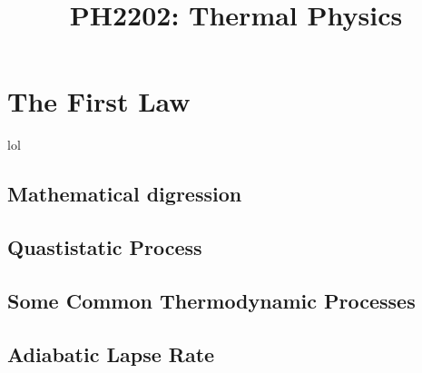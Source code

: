 \documentclass[a4paper]{article}
\title{PH2202: Thermal Physics}
\begin{document}
    
    \newpage
    \tableofcontents
    \newpage 
    
    
   
   \section{The First Law}
   lol
   \subsection{Mathematical digression}
   \subsection{Quastistatic Process}
   \subsection{Some Common Thermodynamic Processes}
   \subsection{Adiabatic Lapse Rate}


   
\end{document}

